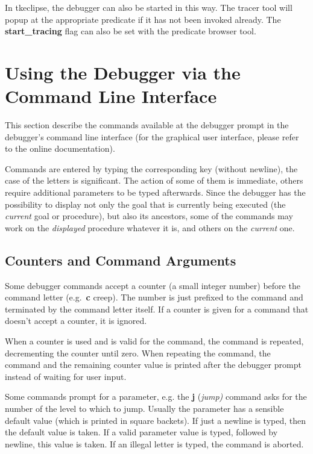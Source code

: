In tkeclipse, the debugger can also be started in this way. The tracer tool
will popup at the appropriate predicate if it has not been invoked
already. The {\bf start_tracing} flag can also be set with the predicate
browser tool.

\section{Using the Debugger via the Command Line Interface}
This section describe the commands available at the debugger prompt
in the debugger's command line interface (for the graphical user
interface, please refer to the online documentation).

Commands are entered by typing the corresponding key
(without newline), the case of the letters is significant.  The action
of some of them is immediate, others require additional parameters to
be typed afterwards.  Since the {\eclipse} debugger has the possibility to
display not only the goal that is currently being executed (the {\it
current} goal or procedure), but also its ancestors, some of the
commands may work on the {\it displayed} procedure whatever it is, and
others on the {\it current} one.

\subsection{Counters and Command Arguments}
Some debugger commands accept a counter (a small integer number)
before the command letter (e.g.\ {\bf c} creep).
The number is just prefixed to the command and terminated by the
command letter itself. If a counter is given for a command that
doesn't accept a counter, it is ignored.

When a counter is used and is valid for the command,
the command is repeated, decrementing the counter until zero.
When repeating the command, the command and the remaining counter
value is printed after the debugger prompt instead of waiting for user input.

Some commands prompt for a parameter, e.g. the {\bf j} ({\it jump)}
command asks for the number of the level to which to jump.
Usually the parameter has a sensible default value (which is printed
in square backets). If just a newline is typed, then the default value
is taken. If a valid parameter value is typed, followed by newline,
this value is taken. If an illegal letter is typed, the command is aborted.


